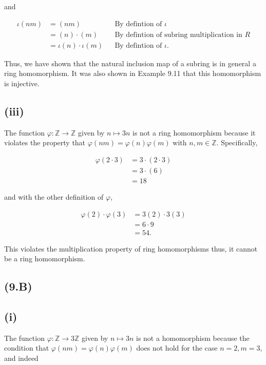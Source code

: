 \documentclass{article}
\begin{document}
      \noindent and

      \begin{align*}
        \iota(nm) &= (nm)  && \text{By defintion of } \iota \\
        &=  (n) \cdot (m) && \text{By defintion of subring multiplication in } R\\
        &= \iota(n) \cdot \iota(m) && \text{By defintion of } \iota.
      \end{align*}


      Thus, we have shown that the natural inclusion map of a subring is in general a ring homomorphism. It was also shown in Example 9.11 that this homomorphism is injective.

    \subsection*{(iii)}
      The function $\varphi: \mathbb{Z} \rightarrow \mathbb{Z}$ given by $n \mapsto 3n$ is not a ring homomorphism because it violates the property that $\varphi(nm) = \varphi(n)\varphi(m)$ with $n,m \in \mathbb{Z}$. Specifically, 

      \begin{align*}
        \varphi(2 \cdot 3) &= 3 \cdot (2 \cdot 3)  \\
        &= 3 \cdot(6)\\
        &= 18
      \end{align*}

      \noindent and with the other definition of $\varphi$,
      
      \begin{align*}
        \varphi(2) \cdot \varphi(3) &= 3(2) \cdot 3(3)  \\
        &= 6 \cdot 9\\
        &= 54.
      \end{align*}

      This violates the multiplication property of ring homomorphisms thus, it cannot be a ring homomorphism.


  \subsection*{(9.B)}
      \subsection*{(i)}
      The function $\varphi: \mathbb{Z} \rightarrow 3\mathbb{Z}$ given by $n \mapsto 3n$ is not a homomorphism because the condition that $\varphi(nm) = \varphi(n)\varphi(m)$ does not hold for the case $n = 2, m=3$, and indeed
\end{document}
